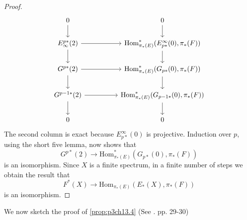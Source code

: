 \documentclass[../main]{subfiles}
\begin{document}
\begin{proof}
\[\begin{tikzcd}
	0 && 0 \\
	{E_{\infty}^{p\ast}(2)} && {\text{Hom}^{\ast}_{\pi_\ast(E)}(E^\infty_{p\ast}(0), \pi_\ast(F))} \\
	{G^{p\ast}(2)} && {\text{Hom}^{\ast}_{\pi_\ast(E)}(G_{p\ast}(0), \pi_\ast(F))} \\
	{G^{p-1\ast}}(2) && {\text{Hom}^{\ast}_{\pi_\ast(E)}(G_{p-1\ast}(0), \pi_\ast(F))} \\
	0 && 0
	\arrow[from=1-1, to=2-1]
	\arrow[from=2-1, to=3-1]
	\arrow[from=3-1, to=4-1]
	\arrow[from=4-1, to=5-1]
	\arrow[from=1-3, to=2-3]
	\arrow[from=2-3, to=3-3]
	\arrow[from=3-3, to=4-3]
	\arrow[from=4-3, to=5-3]
	\arrow[from=2-1, to=2-3]
	\arrow[from=3-1, to=3-3]
	\arrow[from=4-1, to=4-3]
\end{tikzcd}\]
The second column is exact because $E^{\infty}_{p\ast}(0)$ is projective. Induction over $p$, using the short five lemma, now shows that 
\[G^{p\ast}(2)\longrightarrow \text{Hom}^{\ast}_{\pi_\ast(E)}(G_{p\ast}(0), \pi_\ast(F))\]
is an isomorphism. Since $X$ is a finite spectrum, in a finite number of steps we obtain the result that
\[F^\ast(X)\longrightarrow \text{Hom}_{\pi_\ast(E)}(E_\ast(X), \pi_\ast(F))\]
is an isomorphism.
\end{proof}
We now sketch the proof of \ref{prop:p3ch13.4} (See \cite{adams3}. pp. 29-30)
\end{document}
